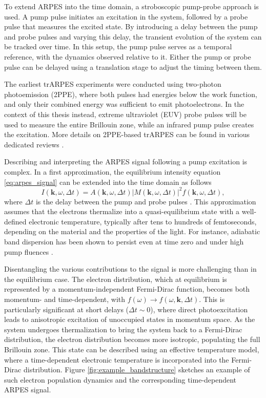 To extend ARPES into the time domain, a stroboscopic pump-probe approach is used.
A pump pulse initiates an excitation in the system, followed by a probe pulse that measures the excited state.
By introducing a delay between the pump and probe pulses and varying this delay, the transient evolution of the system can be tracked over time.
In this setup, the pump pulse serves as a temporal reference, with the dynamics observed relative to it.
Either the pump or probe pulse can be delayed using a translation stage to adjust the timing between them.

The earliest trARPES experiments were conducted using two-photon photoemission (2PPE), where both pulses had energies below the work function, and only their combined energy was sufficient to emit photoelectrons.
In the context of this thesis instead, extreme ultraviolet (EUV) probe pulses will be used to measure the entire Brillouin zone, while an infrared pump pulse creates the excitation.
More details on 2PPE-based trARPES can be found in various dedicated reviews \cite{damascelli_multiphoton_1996,bartoli_nonlinear_1997,hofer_time-resolved_1997,bovensiepen_elementary_2012,cui_transient_2014}.

Describing and interpreting the ARPES signal following a pump excitation is complex.
In a first approximation, the equilibrium intensity equation \ref{eq:arpes_signal} can be extended into the time domain as follows
\begin{equation}
	I(\mathbf{k}, \omega, \Delta t) = A(\mathbf{k}, \omega, \Delta t)\left|M(\mathbf{k}, \omega, \Delta t)\right|^2f(\mathbf{k}, \omega, \Delta t),
\end{equation}
where $\Delta t$ is the delay between the pump and probe pulses \cite{freericks_what_2021}.
This approximation assumes that the electrons thermalize into a quasi-equilibrium state with a well-defined electronic temperature, typically after tens to hundreds of femtoseconds, depending on the material and the properties of the light.
For instance, adiabatic band dispersion has been shown to persist even at time zero and under high pump fluences \cite{boschini_time-resolved_2024,neufeld_time-_2022}.

Disentangling the various contributions to the signal is more challenging than in the equilibrium case.
The electron distribution, which at equilibrium is represented by a momentum-independent Fermi-Dirac function, becomes both momentum- and time-dependent, with $f(\omega) \rightarrow f(\omega, \mathbf{k}, \Delta t)$.
This is particularly significant at short delays ($\Delta t \sim 0$), where direct photoexcitation leads to anisotropic excitation of unoccupied states in momentum space.
As the system undergoes thermalization to bring the system back to a Fermi-Dirac distribution, the electron distribution becomes more isotropic, populating the full Brillouin zone.
This state can be described using an effective temperature model, where a time-dependent electronic temperature is incorporated into the Fermi-Dirac distribution.
Figure \ref{fig:example_bandstructure} sketches an example of such electron population dynamics and the corresponding time-dependent ARPES signal.

